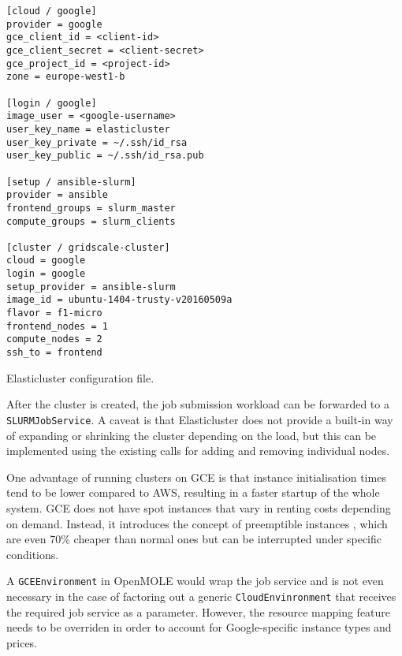 \begin{listing}[h]
	\centering
	\begin{minipage}{8cm}
		\begin{verbatim}
[cloud / google]
provider = google
gce_client_id = <client-id>
gce_client_secret = <client-secret>
gce_project_id = <project-id>
zone = europe-west1-b	

[login / google]
image_user = <google-username>
user_key_name = elasticluster
user_key_private = ~/.ssh/id_rsa
user_key_public = ~/.ssh/id_rsa.pub

[setup / ansible-slurm]
provider = ansible
frontend_groups = slurm_master
compute_groups = slurm_clients

[cluster / gridscale-cluster]
cloud = google
login = google
setup_provider = ansible-slurm
image_id = ubuntu-1404-trusty-v20160509a
flavor = f1-micro
frontend_nodes = 1
compute_nodes = 2
ssh_to = frontend
		\end{verbatim}
	\end{minipage}
	\caption{Elasticluster configuration file.}
	\label{ElastiClusterConfig}
\end{listing}

After the cluster is created, the job submission workload can be forwarded to a \verb|SLURMJobService|. A caveat is that Elasticluster does not provide a built-in way of expanding or shrinking the cluster depending on the load, but this can be implemented using the existing calls for adding and removing individual nodes.

One advantage of running clusters on GCE is that instance initialisation times tend to be lower compared to AWS, resulting in a faster startup of the whole system. GCE does not have spot instances that vary in renting costs depending on demand. Instead, it introduces the concept of preemptible instances \cite{Preemptible}, which are even 70\% cheaper than normal ones but can be interrupted under specific conditions.

A \verb|GCEEnvironment| in OpenMOLE would wrap the job service and is not even necessary in the case of factoring out a generic \verb|CloudEnvinronment| that receives the required job service as a parameter. However, the resource mapping feature needs to be overriden in order to account for Google-specific instance types and prices.